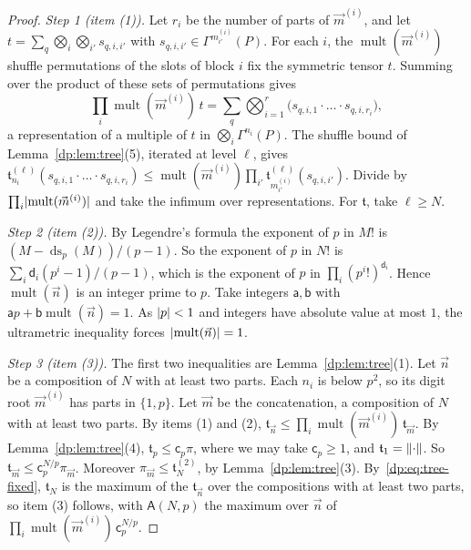 \begin{proof}
\emph{Step 1 (item (1)).} Let $r_i$ be the number of parts of $\vec m^{(i)}$, and let $t=\sum_q\bigotimes_i\bigotimes_{i'}s_{q,i,i'}$ with $s_{q,i,i'}\in\Gamma^{m^{(i)}_{i'}}(P)$. For each $i$, the $\operatorname{mult}(\vec m^{(i)})$ shuffle permutations of the slots of block $i$ fix the symmetric tensor $t$. Summing over the product of these sets of permutations gives
\[
 \prod_i\operatorname{mult}(\vec m^{(i)})\,t=\sum_q\bigotimes_{i=1}^r\bigl(s_{q,i,1}\cdot\ldots\cdot s_{q,i,r_i}\bigr),
\]
a representation of a multiple of $t$ in $\bigotimes_i\Gamma^{n_i}(P)$. The shuffle bound of Lemma~\ref{dp:lem:tree}(5), iterated at level $\ell$, gives $\mathfrak t^{(\ell)}_{n_i}(s_{q,i,1}\cdot\ldots\cdot s_{q,i,r_i})\le\operatorname{mult}(\vec m^{(i)})\prod_{i'}\mathfrak t^{(\ell)}_{m^{(i)}_{i'}}(s_{q,i,i'})$. Divide by $\prod_i\lvert \operatorname{mult}(\vec m^{(i)})\rvert$ and take the infimum over representations. For $\mathfrak t$, take $\ell\ge N$.

\emph{Step 2 (item (2)).} By Legendre's formula the exponent of $p$ in $M!$ is $(M-\operatorname{ds}_p(M))/(p-1)$. So the exponent of $p$ in $N!$ is $\sum_i\mathsf d_i(p^i-1)/(p-1)$, which is the exponent of $p$ in $\prod_i(p^i!)^{\mathsf d_i}$. Hence $\operatorname{mult}(\vec n)$ is an integer prime to $p$. Take integers $\mathsf a,\mathsf b$ with $\mathsf ap+\mathsf b\operatorname{mult}(\vec n)=1$. As $\lvert p\rvert<1$ and integers have absolute value at most $1$, the ultrametric inequality forces $\lvert \operatorname{mult}(\vec n)\rvert=1$.

\emph{Step 3 (item (3)).} The first two inequalities are Lemma~\ref{dp:lem:tree}(1). Let $\vec n$ be a composition of $N$ with at least two parts. Each $n_i$ is below $p^2$, so its digit root $\vec m^{(i)}$ has parts in $\{1,p\}$. Let $\vec m$ be the concatenation, a composition of $N$ with at least two parts. By items (1) and (2), $\mathfrak t_{\vec n}\le\prod_i\operatorname{mult}(\vec m^{(i)})\,\mathfrak t_{\vec m}$. By Lemma~\ref{dp:lem:tree}(4), $\mathfrak t_p\le\mathsf c_p\pi$, where we may take $\mathsf c_p\ge1$, and $\mathfrak t_1=\lVert \cdot\rVert$. So $\mathfrak t_{\vec m}\le\mathsf c_p^{N/p}\pi_{\vec m}$. Moreover $\pi_{\vec m}\le\mathfrak t^{(2)}_N$, by Lemma~\ref{dp:lem:tree}(3). By~\eqref{dp:eq:tree-fixed}, $\mathfrak t_N$ is the maximum of the $\mathfrak t_{\vec n}$ over the compositions with at least two parts, so item (3) follows, with $\mathsf A(N,p)$ the maximum over $\vec n$ of $\prod_i\operatorname{mult}(\vec m^{(i)})\,\mathsf c_p^{N/p}$.
\end{proof}

